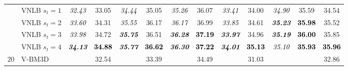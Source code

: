 \documentclass[10pt, journal, twocolumn, final, a4paper]{IEEEtran}
\newcommand{\bsic}[1]{\textcolor{black}{\textit{#1}}}
\newcommand{\Bsic}[1]{\textcolor{black}{\textbf{\textit{#1}}}}
\newcommand{\Best}[1]{\textbf{\textcolor{black}{#1}}}
\begin{document}
\begin{table}[htp!]
\begin{center}
{\begin{tabular}{ c | l |c c | c c | c c | c c | c c | c}
			                      & VNLB   $s_t = 1$     & \bsic{32.43} &       33.05  & \bsic{34.44} &       35.05  & \bsic{35.26} &       36.07  & \bsic{33.41} &       34.00  & \bsic{34.90} &       35.59  &       34.54  \\
			                      & VNLB   $s_t = 2$     & \bsic{33.60} &       34.31  & \bsic{35.55} &       36.17  & \bsic{36.17} &       36.99  & \bsic{33.85} &       34.61  & \Bsic{35.23} & \Best{35.98} &       35.52  \\
			                      & VNLB   $s_t = 3$     & \bsic{33.98} &       34.72  & \Bsic{35.75} &       36.51  & \Bsic{36.28} & \Best{37.19} & \Bsic{33.97} &       34.96  & \Bsic{35.19} & \Best{36.00} &       35.85  \\
			                      & VNLB   $s_t = 4$     & \Bsic{34.13} & \Best{34.88} & \Bsic{35.77} & \Best{36.62} & \Bsic{36.30} & \Best{37.22} & \Bsic{34.01} & \Best{35.13} & \bsic{35.10} & \Best{35.93} & \Best{35.96} \\\hline
			\multirow{1}{*}{$20$}
			                      & V-BM3D               & \bsic{     } &       32.54  & \bsic{     } &       33.39  & \bsic{     } &       34.49  & \bsic{     } &       31.03  & \bsic{     } &              &       32.86  \\

\end{tabular}}
\end{center}
\end{table}
\end{document}
